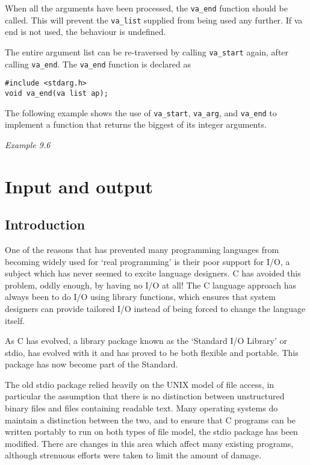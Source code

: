   When all the  arguments  have  been  processed,  the  \texttt{va\_end}
   function  should  be  called.  This will prevent the \texttt{va\_list}
   supplied from being used any  further.   If  va end  is  not used, the
   behaviour is undefined.


  The entire argument list  can  be  re-traversed  by  calling
   \texttt{va\_start}  again,  after calling \texttt{va\_end}.  The
   \texttt{va\_end} function is declared as


  \begin{Verbatim}
#include <stdarg.h>
void va_end(va list ap);
\end{Verbatim}

  The following example shows the use of \texttt{va\_start},
   \texttt{va\_arg}, and \texttt{va\_end}  to  implement a function that
   returns the biggest of its integer arguments.


  \begin{center}\textit{Example 9.6}\end{center}


 
        \section{Input and output}
        

  

  \subsection{Introduction}
   

   One of the reasons that has prevented many programming languages from
    becoming widely used for `real programming' is their poor support for
    I/O, a subject which has never seemed to excite language designers.
    C has avoided this problem, oddly enough, by having no I/O at all!
    The C language approach has always been to do I/O using library functions,
    which ensures that system designers can provide tailored I/O instead of
    being forced to change the language itself.


   As C has evolved, a library package known as the `Standard I/O
    Library' or stdio, has evolved with it and has proved to be both
    flexible and portable.  This package has now become part of the
    Standard.


   The old stdio package relied heavily on the UNIX model of file access, in
    particular the assumption that there is no distinction between unstructured
    binary files and files containing readable text.  Many operating systems do
    maintain a distinction between the two, and to ensure that C programs can
    be written portably to run on both types of file model, the stdio package
    has been modified.  There are changes in this area which affect many
    existing programs, although strenuous efforts were taken to limit the
    amount of damage.


